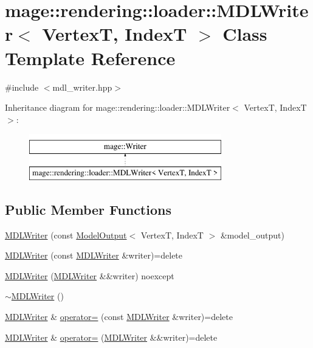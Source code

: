 \hypertarget{classmage_1_1rendering_1_1loader_1_1_m_d_l_writer}{}\section{mage\+:\+:rendering\+:\+:loader\+:\+:M\+D\+L\+Writer$<$ VertexT, IndexT $>$ Class Template Reference}
\label{classmage_1_1rendering_1_1loader_1_1_m_d_l_writer}


{\ttfamily \#include $<$mdl\+\_\+writer.\+hpp$>$}

Inheritance diagram for mage\+:\+:rendering\+:\+:loader\+:\+:M\+D\+L\+Writer$<$ VertexT, IndexT $>$\+:\begin{figure}[H]
\begin{center}
\leavevmode
\includegraphics[height=2.000000cm]{classmage_1_1rendering_1_1loader_1_1_m_d_l_writer}
\end{center}
\end{figure}
\subsection*{Public Member Functions}
\begin{DoxyCompactItemize}
\item 
\hyperlink{classmage_1_1rendering_1_1loader_1_1_m_d_l_writer_a6b30e49f08b5c6cd4702f5fdecd17561}{M\+D\+L\+Writer} (const \hyperlink{structmage_1_1rendering_1_1_model_output}{Model\+Output}$<$ VertexT, IndexT $>$ \&model\+\_\+output)
\item 
\hyperlink{classmage_1_1rendering_1_1loader_1_1_m_d_l_writer_a475ff3efdba707303052bae28d3ba85b}{M\+D\+L\+Writer} (const \hyperlink{classmage_1_1rendering_1_1loader_1_1_m_d_l_writer}{M\+D\+L\+Writer} \&writer)=delete
\item 
\hyperlink{classmage_1_1rendering_1_1loader_1_1_m_d_l_writer_a27f71b3a27f96e263948d19b8b570309}{M\+D\+L\+Writer} (\hyperlink{classmage_1_1rendering_1_1loader_1_1_m_d_l_writer}{M\+D\+L\+Writer} \&\&writer) noexcept
\item 
\hyperlink{classmage_1_1rendering_1_1loader_1_1_m_d_l_writer_aaa0fb8c60dee5352ed467bfb3f283f43}{$\sim$\+M\+D\+L\+Writer} ()
\item 
\hyperlink{classmage_1_1rendering_1_1loader_1_1_m_d_l_writer}{M\+D\+L\+Writer} \& \hyperlink{classmage_1_1rendering_1_1loader_1_1_m_d_l_writer_a9e5f38a8b5016534385039d44d3d71dc}{operator=} (const \hyperlink{classmage_1_1rendering_1_1loader_1_1_m_d_l_writer}{M\+D\+L\+Writer} \&writer)=delete
\item 
\hyperlink{classmage_1_1rendering_1_1loader_1_1_m_d_l_writer}{M\+D\+L\+Writer} \& \hyperlink{classmage_1_1rendering_1_1loader_1_1_m_d_l_writer_aaa2a3f4e8025bffefefaae7d3ef018f0}{operator=} (\hyperlink{classmage_1_1rendering_1_1loader_1_1_m_d_l_writer}{M\+D\+L\+Writer} \&\&writer)=delete
\end{DoxyCompactItemize}
